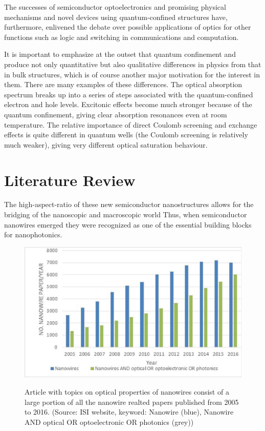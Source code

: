 The successes of semiconductor optoelectronics and promising physical
mechanisms and novel devices using quantum-confined structures have,
furthermore, enlivened the debate over possible applications of optics for
other functions such as logic and switching in communications and computation.

It is important to emphasize at the outset that quantum confinement and produce
not only quantitative but also qualitative differences in physics from that in
bulk structures, which is of course another major motivation for the interest
in them. There are many examples of these differences. The optical absorption
spectrum breaks up into a series of steps associated with the quantum-confined
electron and hole levels. Excitonic effects become much stronger because of the
quantum confinement, giving clear absorption resonances even at room
temperature. The relative importance of direct Coulomb screening and exchange
effects is quite different in quantum wells (the Coulomb screening is
relatively much weaker), giving very different optical saturation behaviour.


\section{Literature Review} \label{sec:intro_LR}

The high-aspect-ratio of these new semiconductor nanostructures allows for the
bridging of the nanoscopic and macroscopic world Thus, when semiconductor
nanowires emerged they were recognized as one of the essential building blocks
for nanophotonics.

\begin{figure}
  \caption{Article with topics on optical properties of nanowires consist of a large portion of all the nanowire realted papers published from 2005 to 2016. (Source: ISI website, keyword: Nanowire (blue), Nanowire AND optical OR optoelectronic OR photonics (grey))}
  \centering
  \includegraphics[width=\textwidth]{pictures/Introduction/ISIPublication}
  \label{ISIPublication}
\end{figure}



